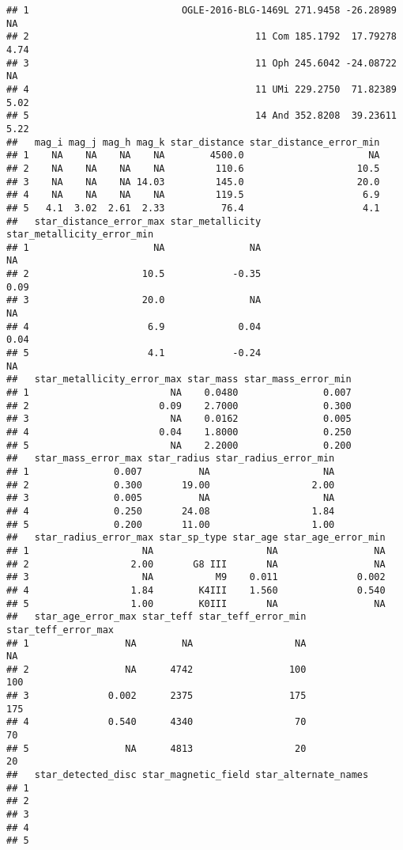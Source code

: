 \documentclass[]{article}
\begin{document}
\begin{verbatim}
## 1                           OGLE-2016-BLG-1469L 271.9458 -26.28989    NA
## 2                                        11 Com 185.1792  17.79278  4.74
## 3                                        11 Oph 245.6042 -24.08722    NA
## 4                                        11 UMi 229.2750  71.82389  5.02
## 5                                        14 And 352.8208  39.23611  5.22
##   mag_i mag_j mag_h mag_k star_distance star_distance_error_min
## 1    NA    NA    NA    NA        4500.0                      NA
## 2    NA    NA    NA    NA         110.6                    10.5
## 3    NA    NA    NA 14.03         145.0                    20.0
## 4    NA    NA    NA    NA         119.5                     6.9
## 5   4.1  3.02  2.61  2.33          76.4                     4.1
##   star_distance_error_max star_metallicity star_metallicity_error_min
## 1                      NA               NA                         NA
## 2                    10.5            -0.35                       0.09
## 3                    20.0               NA                         NA
## 4                     6.9             0.04                       0.04
## 5                     4.1            -0.24                         NA
##   star_metallicity_error_max star_mass star_mass_error_min
## 1                         NA    0.0480               0.007
## 2                       0.09    2.7000               0.300
## 3                         NA    0.0162               0.005
## 4                       0.04    1.8000               0.250
## 5                         NA    2.2000               0.200
##   star_mass_error_max star_radius star_radius_error_min
## 1               0.007          NA                    NA
## 2               0.300       19.00                  2.00
## 3               0.005          NA                    NA
## 4               0.250       24.08                  1.84
## 5               0.200       11.00                  1.00
##   star_radius_error_max star_sp_type star_age star_age_error_min
## 1                    NA                    NA                 NA
## 2                  2.00       G8 III       NA                 NA
## 3                    NA           M9    0.011              0.002
## 4                  1.84        K4III    1.560              0.540
## 5                  1.00        K0III       NA                 NA
##   star_age_error_max star_teff star_teff_error_min star_teff_error_max
## 1                 NA        NA                  NA                  NA
## 2                 NA      4742                 100                 100
## 3              0.002      2375                 175                 175
## 4              0.540      4340                  70                  70
## 5                 NA      4813                  20                  20
##   star_detected_disc star_magnetic_field star_alternate_names
## 1                                                            
## 2                                                            
## 3                                                            
## 4                                                            
## 5
\end{verbatim}
\end{document}
